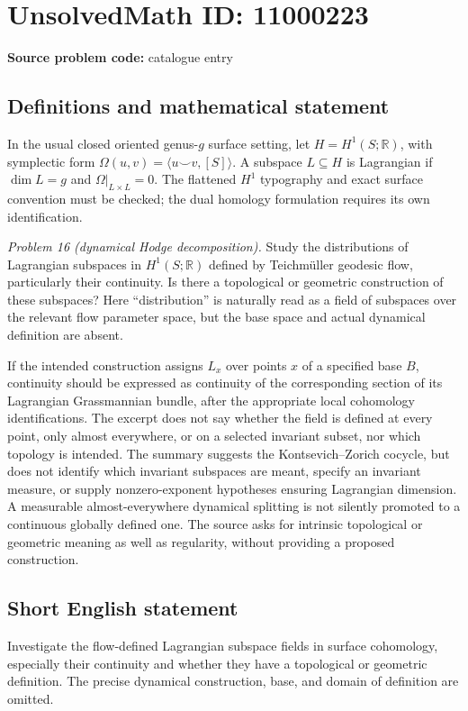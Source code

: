 \documentclass[11pt]{article}
\newcommand{\R}{\mathbb{R}}
\begin{document}
\section*{UnsolvedMath ID: 11000223}
\textbf{Source problem code:} catalogue entry
\subsection{Definitions and mathematical statement}
In the usual closed oriented genus-\(g\) surface setting, let \(H=H^1(S;\R)\), with symplectic form \(\Omega(u,v)=\langle u\smile v,[S]\rangle\). A subspace \(L\subseteq H\) is Lagrangian if \(\dim L=g\) and \(\Omega|_{L\times L}=0\). The flattened \(H^1\) typography and exact surface convention must be checked; the dual homology formulation requires its own identification.

\emph{Problem 16 (dynamical Hodge decomposition).} Study the distributions of Lagrangian subspaces in \(H^1(S;\R)\) defined by Teichm\"uller geodesic flow, particularly their continuity. Is there a topological or geometric construction of these subspaces? Here ``distribution'' is naturally read as a field of subspaces over the relevant flow parameter space, but the base space and actual dynamical definition are absent.

If the intended construction assigns \(L_x\) over points \(x\) of a specified base \(B\), continuity should be expressed as continuity of the corresponding section of its Lagrangian Grassmannian bundle, after the appropriate local cohomology identifications. The excerpt does not say whether the field is defined at every point, only almost everywhere, or on a selected invariant subset, nor which topology is intended. The summary suggests the Kontsevich--Zorich cocycle, but does not identify which invariant subspaces are meant, specify an invariant measure, or supply nonzero-exponent hypotheses ensuring Lagrangian dimension. A measurable almost-everywhere dynamical splitting is not silently promoted to a continuous globally defined one. The source asks for intrinsic topological or geometric meaning as well as regularity, without providing a proposed construction.
\subsection{Short English statement}
Investigate the flow-defined Lagrangian subspace fields in surface cohomology, especially their continuity and whether they have a topological or geometric definition. The precise dynamical construction, base, and domain of definition are omitted.
\end{document}
